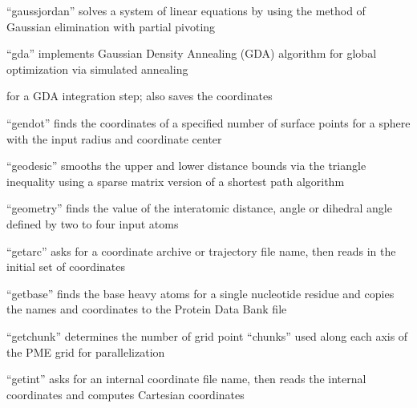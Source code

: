 \documentclass[letterpaper,11pt,english]{sphinxmanual}
\begin{document}

“gaussjordan” solves a system of linear equations by using
the method of Gaussian elimination with partial pivoting


“gda” implements Gaussian Density Annealing (GDA) algorithm
for global optimization via simulated annealing





for a GDA integration step; also saves the coordinates


“gendot” finds the coordinates of a specified number of surface
points for a sphere with the input radius and coordinate center


“geodesic” smooths the upper and lower distance bounds via
the triangle inequality using a sparse matrix version of a
shortest path algorithm


“geometry” finds the value of the interatomic distance, angle
or dihedral angle defined by two to four input atoms


“getarc” asks for a coordinate archive or trajectory file name,
then reads in the initial set of coordinates


“getbase” finds the base heavy atoms for a single nucleotide
residue and copies the names and coordinates to the Protein
Data Bank file


“getchunk” determines the number of grid point “chunks” used
along each axis of the PME grid for parallelization


“getint” asks for an internal coordinate file name, then reads
the internal coordinates and computes Cartesian coordinates

\end{document}

